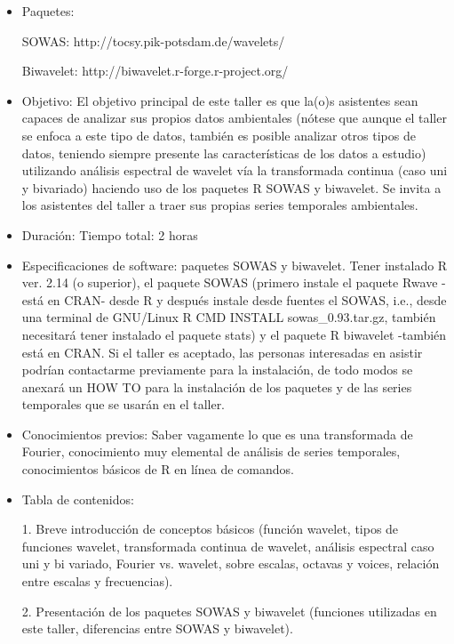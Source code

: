 \begin{itemize}\item Paquetes: 

SOWAS: http://tocsy.pik-potsdam.de/wavelets/

Biwavelet: http://biwavelet.r-forge.r-project.org/ 
 \item Objetivo: 
El objetivo principal de este taller es que la(o)s asistentes sean capaces de analizar sus propios datos ambientales (nótese que aunque  el taller se enfoca a este tipo de datos, también es posible analizar  otros tipos de datos, teniendo siempre presente las características de  los datos a estudio) utilizando análisis espectral de wavelet vía la  transformada continua (caso uni y bivariado) haciendo uso de los paquetes R SOWAS y biwavelet. Se invita a los asistentes del taller a traer sus propias series temporales ambientales. 


\item Duración: 
Tiempo total: 2 horas 

\item Especificaciones de software: paquetes SOWAS y biwavelet.
Tener instalado R ver. 2.14 (o superior), el paquete SOWAS (primero instale el paquete Rwave -está en CRAN- desde R y después instale desde fuentes el SOWAS, i.e., desde una terminal de GNU/Linux  R CMD INSTALL sowas\_0.93.tar.gz, también necesitará tener instalado el paquete stats) y el paquete R biwavelet -también está en CRAN. Si el taller es aceptado, las personas interesadas en asistir podrían contactarme previamente para la instalación, de todo modos se anexará un HOW TO para la instalación de los paquetes y de las series temporales que se usarán en el taller. 


\item Conocimientos previos: 
Saber vagamente lo que es una transformada de Fourier, conocimiento muy elemental de análisis  de series temporales, conocimientos básicos de R en línea de comandos. 


\item Tabla de contenidos: 

1. Breve introducción de conceptos básicos (función wavelet, tipos de funciones wavelet, transformada continua de wavelet, análisis espectral caso uni y bi variado, Fourier vs. wavelet, sobre escalas,  octavas y voices, relación entre escalas y frecuencias).  

2. Presentación de los paquetes SOWAS y biwavelet (funciones utilizadas en este taller, diferencias entre SOWAS y biwavelet). 


\end{itemize}
